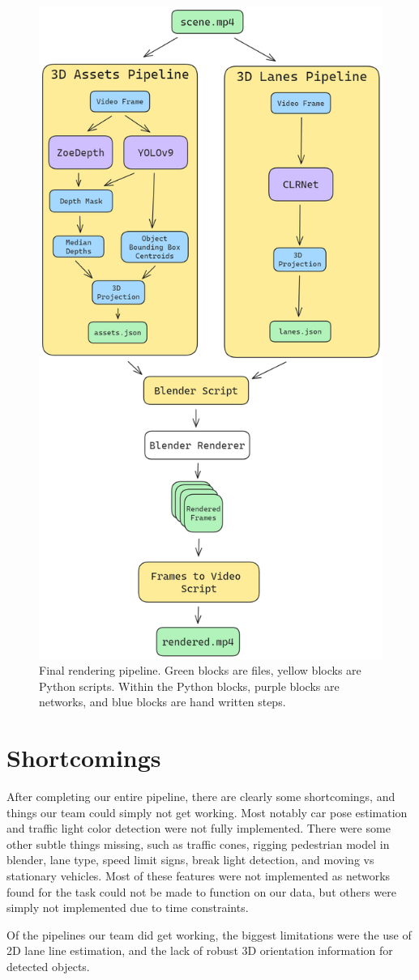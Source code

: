 \begin{figure}
  \centering
  \includegraphics[width=0.95\linewidth]{images/pipeline.png}
  \caption{Final rendering pipeline. Green blocks are files, yellow blocks are Python scripts. Within the Python blocks, purple blocks are networks, and blue blocks are hand written steps.}
  \label{fig:pipeline}
\end{figure}

\section{Shortcomings}
After completing our entire pipeline, there are clearly some shortcomings, and things our team could simply not get working. Most notably car pose estimation and traffic light color detection were not fully implemented. There were some other subtle things missing, such as traffic cones, rigging pedestrian model in blender, lane type, speed limit signs, break light detection, and moving vs stationary vehicles. Most of these features were not implemented as networks found for the task could not be made to function on our data, but others were simply not implemented due to time constraints.

Of the pipelines our team did get working, the biggest limitations were the use of 2D lane line estimation, and the lack of robust 3D orientation information for detected objects.